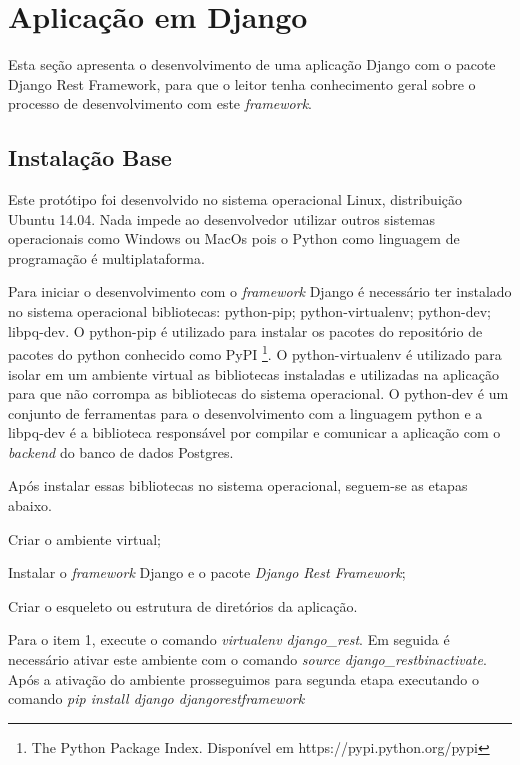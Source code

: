   
\section{Aplicação em Django}
\label{desenvolvimento-django}

  Esta seção apresenta o desenvolvimento de uma aplicação Django com o pacote Django Rest Framework, para que o 
  leitor tenha conhecimento geral sobre o processo de desenvolvimento com este \textit{framework}. 
  
  
\subsection{Instalação Base}

 
  Este protótipo foi desenvolvido no sistema operacional Linux, distribuição Ubuntu 14.04. Nada impede ao desenvolvedor 
  utilizar outros sistemas operacionais como Windows ou MacOs pois o Python como linguagem de programação 
  é multiplataforma. 
  
  Para iniciar o desenvolvimento com o \textit{framework} Django é necessário ter instalado no sistema operacional
  bibliotecas: python-pip; python-virtualenv; python-dev; libpq-dev. O python-pip é utilizado para instalar os 
  pacotes do repositório de pacotes do python conhecido como PyPI \footnote[9]{The Python Package Index. Disponível em https://pypi.python.org/pypi}. 
  O python-virtualenv é utilizado para isolar em um ambiente virtual as bibliotecas instaladas e utilizadas na aplicação 
  para que não corrompa as bibliotecas do sistema operacional. O python-dev é um conjunto de ferramentas para o 
  desenvolvimento com a linguagem python e a libpq-dev é a biblioteca responsável por compilar e comunicar a aplicação 
  com o \textit{backend} do banco de dados Postgres.
  
  Após instalar essas bibliotecas no sistema operacional, seguem-se as etapas abaixo.
  
  \begin{compactitem}
    \item[1)] Criar o ambiente virtual;
    \item[2)] Instalar o \textit{framework} Django e o pacote \textit{Django Rest Framework};
    \item[3)] Criar o esqueleto ou estrutura de diretórios da aplicação.
  \end{compactitem}
  
  Para o item 1, execute o comando \textit{virtualenv django\_rest}. Em seguida é necessário ativar este ambiente com o comando
  \textit{source django\_rest\/bin\/activate}. Após a ativação do ambiente prosseguimos para segunda etapa executando o comando
  \textit{ pip install django djangorestframework}
  
